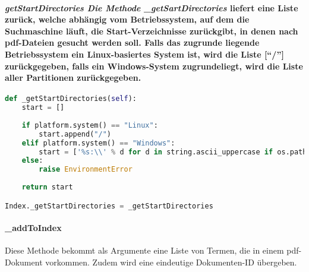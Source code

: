 \paragraph{\texorpdfstring{\emph{getStartDirectories Die Methode
}\_\emph{getSartDirectories} liefert eine Liste zurück, welche abhängig
vom Betriebssystem, auf dem die Suchmaschine läuft, die
Start-Verzeichnisse zurückgibt, in denen nach pdf-Dateien gesucht werden
soll. Falls das zugrunde liegende Betriebssystem ein Linux-basiertes
System ist, wird die Liste \textbf{{[}``/''{]}} zurückgegeben, falls ein
Windows-System zugrundeliegt, wird die Liste aller Partitionen
zurückgegeben.}{getStartDirectories Die Methode \_getSartDirectories liefert eine Liste zurück, welche abhängig vom Betriebssystem, auf dem die Suchmaschine läuft, die Start-Verzeichnisse zurückgibt, in denen nach pdf-Dateien gesucht werden soll. Falls das zugrunde liegende Betriebssystem ein Linux-basiertes System ist, wird die Liste {[}/{]} zurückgegeben, falls ein Windows-System zugrundeliegt, wird die Liste aller Partitionen zurückgegeben.}}\label{getstartdirectories-die-methode-_getsartdirectories-liefert-eine-liste-zuruxfcck-welche-abhuxe4ngig-vom-betriebssystem-auf-dem-die-suchmaschine-luxe4uft-die-start-verzeichnisse-zuruxfcckgibt-in-denen-nach-pdf-dateien-gesucht-werden-soll.-falls-das-zugrunde-liegende-betriebssystem-ein-linux-basiertes-system-ist-wird-die-liste-zuruxfcckgegeben-falls-ein-windows-system-zugrundeliegt-wird-die-liste-aller-partitionen-zuruxfcckgegeben.}

\begin{lstlisting}[language=Python]
def _getStartDirectories(self):
    start = []
    
    if platform.system() == "Linux":
        start.append("/")
    elif platform.system() == "Windows":
        start = ['%s:\\' % d for d in string.ascii_uppercase if os.path.exists('%s:' % d)]
    else:
        raise EnvironmentError
        
    return start

Index._getStartDirectories = _getStartDirectories
\end{lstlisting}

\paragraph{\_addToIndex}\label{addtoindex}

Diese Methode bekommt als Argumente eine Liste von Termen, die in einem
pdf-Dokument vorkommen. Zudem wird eine eindeutige Dokumenten-ID
übergeben.

